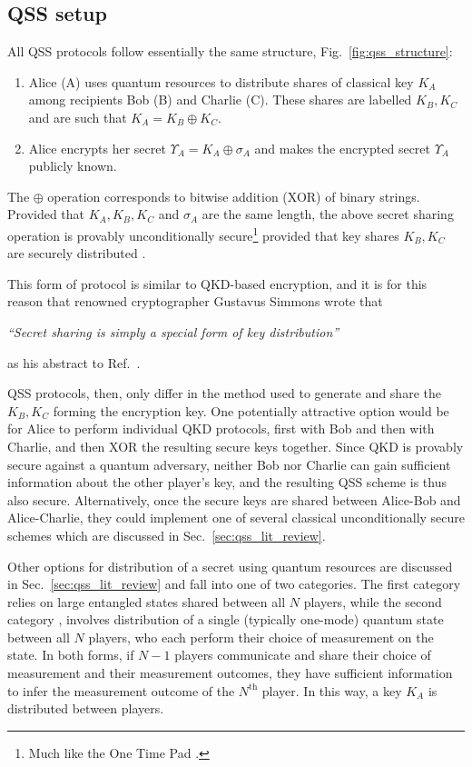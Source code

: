 \subsection{QSS setup}

All QSS protocols follow essentially the same structure, Fig.~\ref{fig:qss_structure}:
\begin{enumerate}
\item Alice (A) uses quantum resources to distribute shares of classical key $K_A$ among recipients Bob (B) and Charlie (C). These shares are labelled $K_B, K_C$ and are such that $K_A = K_B \oplus K_C$.
\item Alice encrypts her secret $\Upsilon_A = K_A \oplus \sigma_A$ and makes the encrypted secret $\Upsilon_A$ publicly known.
\end{enumerate}
The $\oplus$ operation corresponds to bitwise addition (XOR) of binary strings. Provided that $K_A, K_B, K_C$ and $\sigma_A$ are the same length, the above secret sharing operation is provably unconditionally secure\footnote{Much like the One Time Pad \cite{Schneier1996}.} provided that key shares $K_B, K_C$ are securely distributed \cite{Schneier1996}.

This form of protocol is similar to QKD-based encryption, and it is for this reason that renowned cryptographer Gustavus Simmons wrote that 

\begin{center}\emph{``Secret sharing is simply a special form of key distribution''}\end{center}

\noindent as his abstract to Ref.~\cite{Simmons1990a}.

QSS protocols, then, only differ in the method used to generate and share the $K_B, K_C$ forming the encryption key. One potentially attractive option would be for Alice to perform individual QKD protocols, first with Bob and then with Charlie, and then XOR the resulting secure keys together. Since QKD is provably secure against a quantum adversary, neither Bob nor Charlie can gain sufficient information about the other player's key, and the resulting QSS scheme is thus also secure. Alternatively, once the secure keys are shared between Alice-Bob and Alice-Charlie, they could implement one of several classical unconditionally secure schemes which are discussed in Sec.~\ref{sec:qss_lit_review}.

Other options for distribution of a secret using quantum resources are discussed in Sec.~\ref{sec:qss_lit_review} and fall into one of two categories. The first category \cite{Hillery1999, Karlsson1999, Gottesman1999, Markham2008, Wu2016, Kogias2017} relies on large entangled states shared between all $N$ players, while the second category \cite{Zhang2005, Schmid2005, Schmid2007, Grice2019}, involves distribution of a single (typically one-mode) quantum state between all $N$ players, who each perform their choice of measurement on the state. In both forms, if $N-1$ players communicate and share their choice of measurement and their measurement outcomes, they have sufficient information to infer the measurement outcome of the $N^{\text{th}}$ player. In this way, a key $K_A$ is distributed between players.



